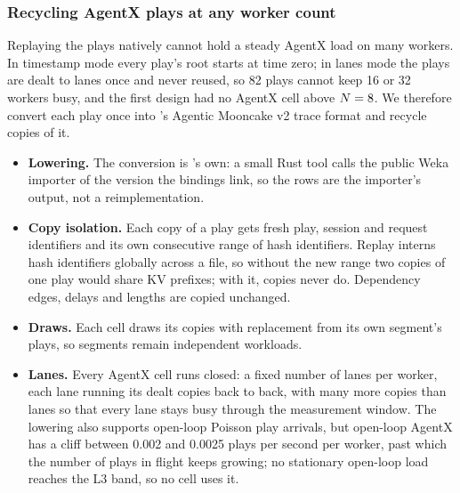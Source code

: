 \subsubsection{Recycling AgentX plays at any worker count}
\label{sec:agentx}\label{app:agentx}

Replaying the plays natively cannot hold a steady AgentX load on many workers. In timestamp mode
every play's root starts at time zero; in lanes mode the plays are dealt to lanes once and never
reused, so 82 plays cannot keep 16 or 32 workers busy, and the first design had no AgentX cell
above $N = 8$. We therefore convert each play once into \aisim{}'s Agentic Mooncake v2 trace
format and recycle copies of it.
\begin{itemize}
  \item \textbf{Lowering.} The conversion is \aisim{}'s own: a small Rust tool calls the public
    Weka importer of the  version the bindings link, so the rows are the
    importer's output, not a reimplementation.
  \item \textbf{Copy isolation.} Each copy of a play gets fresh play, session and request
    identifiers and its own consecutive range of hash identifiers. Replay interns hash
    identifiers globally across a file, so without the new range two copies of one play would
    share KV prefixes; with it, copies never do. Dependency edges, delays and lengths are copied
    unchanged.
  \item \textbf{Draws.} Each cell draws its copies with replacement from its own segment's plays,
    so segments remain independent workloads.
  \item \textbf{Lanes.} Every AgentX cell runs closed: a fixed number of lanes per worker, each
    lane running its dealt copies back to back, with many more copies than lanes so that every
    lane stays busy through the measurement window. The lowering also supports open-loop Poisson
    play arrivals, but open-loop AgentX has a cliff between 0.002 and 0.0025 plays per second per
    worker, past which the number of plays in flight keeps growing; no stationary
    open-loop load reaches the L3 band, so no cell uses it.
\end{itemize}

